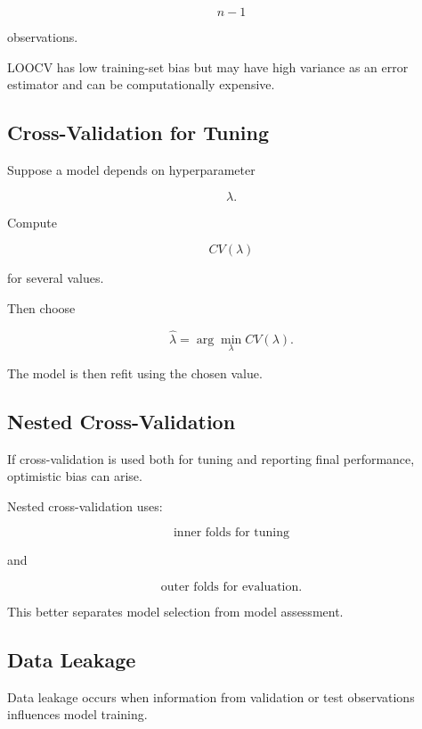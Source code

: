 \[
n-1
\]

observations.

LOOCV has low training-set bias but may have high variance as an error
estimator and can be computationally expensive.

\subsection{Cross-Validation for Tuning}
\label{subsec:cv-for-tuning}

Suppose a model depends on hyperparameter

\[
\lambda.
\]

Compute

\[
CV(\lambda)
\]

for several values.

Then choose

\[
\boxed{
\widehat{\lambda}
=
\arg\min_\lambda
CV(\lambda).
}
\]

The model is then refit using the chosen value.

\subsection{Nested Cross-Validation}
\label{subsec:nested-cross-validation}

If cross-validation is used both for tuning and reporting final
performance, optimistic bias can arise.

Nested cross-validation uses:

\[
\boxed{
\text{inner folds for tuning}
}
\]

and

\[
\boxed{
\text{outer folds for evaluation}.
}
\]

This better separates model selection from model assessment.

\subsection{Data Leakage}
\label{subsec:data-leakage}

Data leakage occurs when information from validation or test observations
influences model training.

